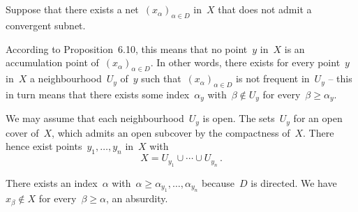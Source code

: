 \subsection{}

Suppose that there exists a net~$(x_α)_{α ∈ D}$ in~$X$ that does not admit a convergent subnet.

According to Proposition 6.10, this means that no point~$y$ in~$X$ is an accumulation point of~$(x_α)_{α ∈ D}$.
In other words, there exists for every point~$y$ in~$X$ a neighbourhood~$U_y$ of~$y$ such that~$(x_α)_{α ∈ D}$ is not frequent in~$U_y$ -- this in turn means that there exists some index~$α_y$ with~$β \notin U_y$ for every~$β ≥ α_y$.

We may assume that each neighbourhood~$U_y$ is open.
The sets~$U_y$ for an open cover of~$X$, which admits an open subcover by the compactness of~$X$.
There hence exist points~$y_1, \dotsc, y_n$ in~$X$ with
\[
	X = U_{y_1} ∪ \dotsb ∪ U_{y_n} \,.
\]

There exists an index~$α$ with~$α ≥ α_{y_1}, \dotsc, α_{y_n}$ because~$D$ is directed.
We have~$x_β ∉ X$ for every~$β ≥ α$, an absurdity.
